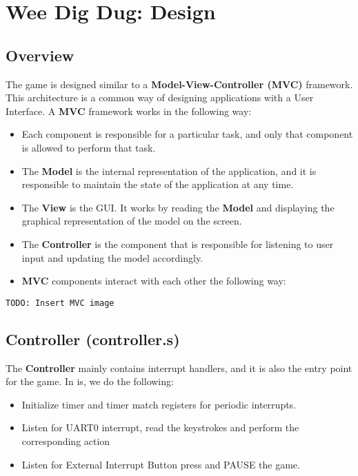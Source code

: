 \documentclass[]{article}
\author{}
\date{}
\begin{document}
\section{Wee Dig Dug: Design}\label{wee-dig-dug-design}

\subsection{Overview}\label{overview}

The game is designed similar to a \textbf{Model-View-Controller (MVC)}
framework. This architecture is a common way of designing applications
with a User Interface. A \textbf{MVC} framework works in the following
way:

\begin{itemize}
\itemsep1pt\parskip0pt
\item
  Each component is responsible for a particular task, and only that
  component is allowed to perform that task.
\item
  The \textbf{Model} is the internal representation of the application,
  and it is responsible to maintain the state of the application at any
  time.
\item
  The \textbf{View} is the GUI. It works by reading the \textbf{Model}
  and displaying the graphical representation of the model on the
  screen.
\item
  The \textbf{Controller} is the component that is responsible for
  listening to user input and updating the model accordingly.
\item
  \textbf{MVC} components interact with each other the following way:
\end{itemize}

\texttt{TODO: Insert MVC image}

\subsection{Controller (controller.s)}\label{controller-controller.s}

The \textbf{Controller} mainly contains interrupt handlers, and it is
also the entry point for the game. In is, we do the following:

\begin{itemize}
\itemsep1pt\parskip0pt
\item
  Initialize timer and timer match registers for periodic interrupts.
\item
  Listen for UART0 interrupt, read the keystrokes and perform the
  corresponding action
\item
  Listen for External Interrupt Button press and PAUSE the game.
\end{itemize}
\end{document}
